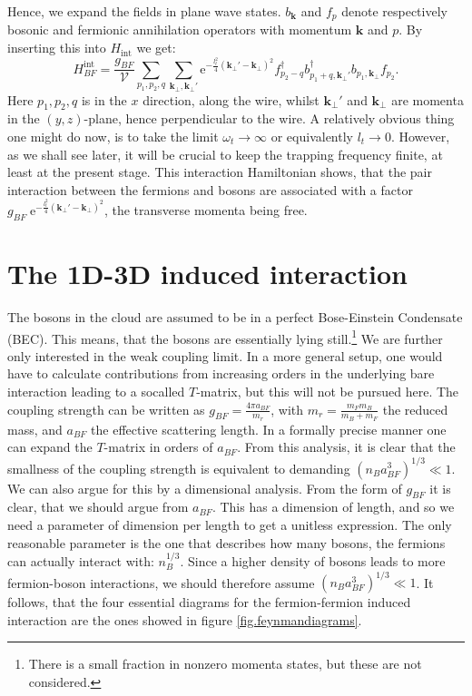 Hence, we expand the fields in plane wave states. $b_\mathbf{k}$ and $f_p$ denote respectively bosonic and fermionic annihilation operators with momentum $\mathbf{k}$ and $p$.  By inserting this into $H_\text{int}$ we get:
\begin{equation}
H_{BF}^\text{int} = \frac{g_{BF}}{\mathcal{V}}\sum_{p_1,p_2,q} \sum_{\mathbf{k}_\perp, \mathbf{k}_\perp'} \text{e}^{-\frac{l_t^2}{4}(\mathbf{k}_\perp'-\mathbf{k}_\perp)^2} f_{p_2-q}^\dagger b_{p_1+q, \mathbf{k}_\perp'}^\dagger b_{p_1,\mathbf{k}_\perp}f_{p_2}.
\end{equation}
Here  $p_1,p_2,q$ is in the $x$ direction, along the wire, whilst $\mathbf{k}_\perp'$ and $\mathbf{k}_\perp$ are momenta in the $(y,z)$-plane, hence perpendicular to the wire. A relatively obvious thing one might do now, is to take the limit $\omega_t \to \infty$ or equivalently $l_t \to 0$. However, as we shall see later, it will be crucial to keep the trapping frequency finite, at least at the present stage. This interaction Hamiltonian shows, that the pair interaction between the fermions and bosons are associated with a factor $g_{BF}\; \text{e}^{-\frac{l_t^2}{4}(\mathbf{k}_\perp'-\mathbf{k}_\perp)^2}$, the transverse momenta being free. 

\section{The 1D-3D induced interaction}
The bosons in the cloud are assumed to be in a perfect Bose-Einstein Condensate (BEC). This means, that the bosons are essentially lying still.\footnote{There is a small fraction in nonzero momenta states, but these are not considered.}  We are further only interested in the weak coupling limit. In a more general setup, one would have to calculate contributions from increasing orders in the underlying bare interaction leading to a socalled $T$-matrix, but this will not be pursued here. The coupling strength can be written as $g_{BF} = \frac{4\pi a_{BF}}{m_r}$, with $m_r = \frac{m_Fm_B}{m_B + m_F}$ the reduced mass, and $a_{BF}$ the effective scattering length. In a formally precise manner one can expand the $T$-matrix in orders of $a_{BF}$. From this analysis, it is clear that the smallness of the coupling strength is equivalent to demanding $(n_Ba_{BF}^3)^{1/3}\ll 1$. We can also argue for this by a dimensional analysis. From the form of $g_{BF}$ it is clear, that we should argue from $a_{BF}$. This has a dimension of length, and so we need a parameter of dimension per length to get a unitless expression. The only reasonable parameter is the one that describes how many bosons, the fermions can actually interact with: $n_B^{1/3}$. Since a higher density of bosons leads to more fermion-boson interactions, we should therefore assume $(n_Ba_{BF}^3)^{1/3} \ll 1$. It follows, that the four essential diagrams for the fermion-fermion induced interaction are the ones showed in figure \ref{fig.feynmandiagrams}. 

